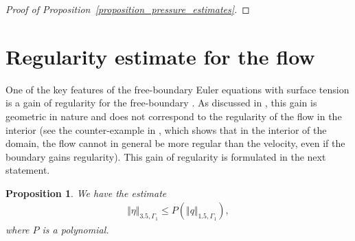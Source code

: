 \documentclass[10pt,reqno]{amsart}
\theoremstyle{plain}
\newtheorem{proposition}[theorem]{Proposition}
\theoremstyle{definition}
\numberwithin{equation}{section}
\newcommand{\Ga}{\Gamma}
\newcommand{\norm}[1]{\Vert#1\Vert}
\begin{document}
\begin{proof}[Proof of Proposition~\ref{proposition_pressure_estimates}]
\end{proof}


\section{Regularity estimate for the flow\label{section_regularity}}
One of the key features of the free-boundary Euler equations with surface tension
is a gain of regularity 
for the free-boundary \cite{CoutandShkollerFreeBoundary, DisconziEbinFreeBoundary3d}.
As discussed in \cite{ShatahZengGeometry}, this gain is geometric in nature and does not
correspond to the regularity of the flow in the interior (see the counter-example
in \cite{ShatahZengGeometry}, which shows that in the interior of the domain, 
the flow cannot in general be more regular than
the velocity, even if the boundary gains regularity). This gain of regularity 
is formulated in 
the next statement.

\begin{proposition}
\label{proposition_regularity}
We have the estimate
\begin{gather}
\norm{\eta}_{3.5,\Ga_1} \leq P(\norm{q}_{1.5,\Ga_1}),
\nonumber
\end{gather}
where $P$ is a polynomial.
\end{proposition}
\end{document}
